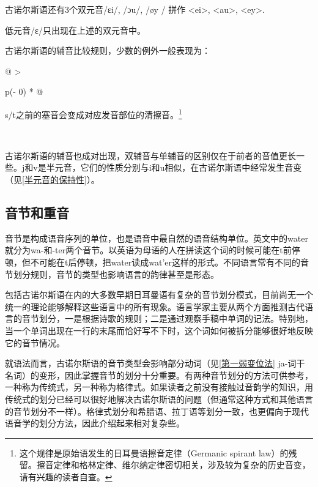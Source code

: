 古诺尔斯语还有3个双元音/ɛi/, /ɔu/, /øy / 拼作 \textless ei\textgreater,
\textless au\textgreater, \textless ey\textgreater.

低元音/ɛ/只出现在上述的双元音中。

古诺尔斯语的辅音比较规则，少数的例外一般表现为：

\begin{longtable}[]{@{}
  >{\raggedright\arraybackslash}p{(\columnwidth - 0\tabcolsep) * }@{}}
\toprule\noalign{}
\begin{minipage}[b]{\linewidth}\raggedright
s/t之前的塞音会变成对应发音部位的清擦音。\footnote{这个规律是原始语发生的日耳曼语擦音定律（Germanic
  spirant
  law）的残留。擦音定律和格林定律、维尔纳定律密切相关，涉及较为复杂的历史音变，请有兴趣的读者自查。\textsubscript{­}}
\end{minipage} \\
\midrule\noalign{}
\endhead
\bottomrule\noalign{}
\endlastfoot
\end{longtable}

古诺尔斯语的辅音也成对出现，双辅音与单辅音的区别仅在于前者的音值更长一些。j和v是半元音，它们的性质分别与i和u相似，在古诺尔斯语中经常发生音变（见\ref{半元音的保持性}）。

\subsection{音节和重音}\label{音节和重音}

音节是构成语音序列的单位，也是语音中最自然的语音结构单位。英文中的water就分为wa-和-ter两个音节。以英语为母语的人在拼读这个词的时候可能在t前停顿，但不可能在t后停顿，把water读成wat'er这样的形式。不同语言常有不同的音节划分规则，音节的类型也影响语言的韵律甚至是形态。

包括古诺尔斯语在内的大多数早期日耳曼语有复杂的音节划分模式，目前尚无一个统一的理论能够解释这些语言中的所有现象。语言学家主要从两个方面推测古代语言的音节划分，一是根据诗歌的规则；二是通过观察手稿中单词的记法。特别地，当一个单词出现在一行的末尾而恰好写不下时，这个词如何被拆分能够很好地反映它的音节情况。

就语法而言，古诺尔斯语的音节类型会影响部分动词（见\ref{第一弱变位法}
ja-词干名词）的变形，因此掌握音节的划分十分重要。有两种音节划分的方法可供参考，一种称为传统式，另一种称为格律式。如果读者之前没有接触过音韵学的知识，用传统式的划分已经可以很好地解决古诺尔斯语的问题（但通常这种方式和其他语言的音节划分不一样）。格律式划分和希腊语、拉丁语等划分一致，也更偏向于现代语音学的划分方法，因此介绍起来相对复杂些。

